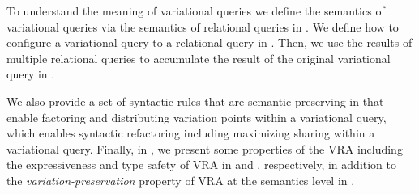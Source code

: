 To understand the meaning of variational queries
we define the semantics of variational queries via the
semantics of relational queries in . We define
how to configure a variational query to a relational query
in . Then, we use the results of multiple relational
queries to accumulate the result of the original variational query 
in .


%
We also provide 
a set of syntactic rules that are semantic-preserving 
in  that enable factoring and distributing
variation points within a variational query, which enables syntactic refactoring
including maximizing sharing within a variational query.
%
Finally, in , we present some properties of the VRA including
the expressiveness and type safety of VRA in  and , respectively,
in addition to the \emph{variation-preservation} property of VRA at the
semantics level in .



%









